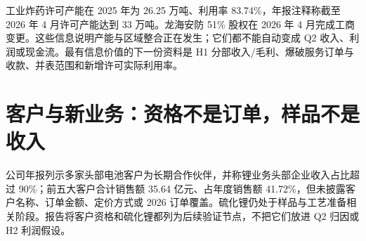 工业炸药许可产能在 2025 年为 26.25 万吨、利用率 83.74\%，年报注释称截至 2026 年 4 月许可产能达到 33 万吨。龙海安防 51\% 股权在 2026 年 4 月完成工商变更。这些信息说明产能与区域整合正在发生；它们都不能自动变成 Q2 收入、利润或现金流。最有信息价值的下一份资料是 H1 分部收入/毛利、爆破服务订单与收款、并表范围和新增许可实际利用率。

\section{客户与新业务：资格不是订单，样品不是收入}

公司年报列示多家头部电池客户为长期合作伙伴，并称锂业务头部企业收入占比超过 90\%；前五大客户合计销售额 35.64 亿元、占年度销售额 41.72\%，但未披露客户名称、订单金额、定价方式或 2026 订单覆盖。硫化锂仍处于样品与工艺准备相关阶段。报告将客户资格和硫化锂都列为后续验证节点，不把它们放进 Q2 归因或 H2 利润假设。
